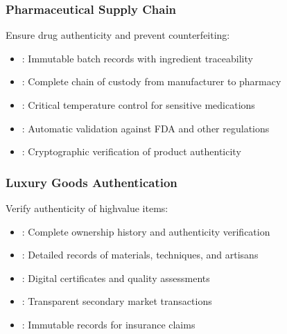 \documentclass[letterpaper,10pt,english]{sphinxmanual}
\begin{document}
\subsubsection{Pharmaceutical Supply Chain}
\label{\detokenize{overview/index:pharmaceutical-supply-chain}}
\sphinxAtStartPar
Ensure drug authenticity and prevent counterfeiting:
\begin{itemize}
\item {} 
\sphinxAtStartPar
{}: Immutable batch records with ingredient traceability

\item {} 
\sphinxAtStartPar
{}: Complete chain of custody from manufacturer to pharmacy

\item {} 
\sphinxAtStartPar
{}: Critical temperature control for sensitive medications

\item {} 
\sphinxAtStartPar
{}: Automatic validation against FDA and other regulations

\item {} 
\sphinxAtStartPar
{}: Cryptographic verification of product authenticity

\end{itemize}


\subsubsection{Luxury Goods Authentication}
\label{\detokenize{overview/index:luxury-goods-authentication}}
\sphinxAtStartPar
Verify authenticity of high\sphinxhyphen{}value items:
\begin{itemize}
\item {} 
\sphinxAtStartPar
{}: Complete ownership history and authenticity verification

\item {} 
\sphinxAtStartPar
{}: Detailed records of materials, techniques, and artisans

\item {} 
\sphinxAtStartPar
{}: Digital certificates and quality assessments

\item {} 
\sphinxAtStartPar
{}: Transparent secondary market transactions

\item {} 
\sphinxAtStartPar
{}: Immutable records for insurance claims

\end{itemize}
\end{document}
